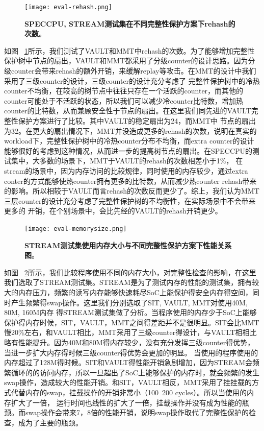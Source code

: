 \begin{figure}[!htp]
    \centering
    \texttt{[image: eval-rehash.png]}
    \caption{\textbf{SPECCPU, STREAM测试集在不同完整性保护方案下rehash的次数}。}
   \label{fig:eval-rehash}
\end{figure}
如图 ~\ref{fig:eval-rehash}所示，我们测试了VAULT和MMT中rehash的次数。为了能够增加完整性保护树中节点的扇出，VAULT和MMT都采用了分级counter的设计思路。因为分级counter会带来rehash的额外开销，来缓解replay等攻击。在MMT的设计中我们采用了三级counter的设计，三级counter的设计充分考虑了
完整性保护树中的冷热counter不均衡，在较高的树节点中往往只存在一个活跃的counter，而其他的counter可能处于不活跃的状态，所以我们可以减少冷counter比特数，增加热counter的比特数，从而兼顾安全性于节点的扇出。在这里我们同先进的VAULT完整性保护方案进行了比较。其中VAULT的稳定扇出为24，而MMT中
节点的扇出为32。在更大的扇出情况下，MMT并没造成更多的rehash的次数，说明在真实的workload下，完整性保护树中的冷热counter分布不均衡，而extra counter的设计能够很好的考虑到这种情况，从而进一步的提高树节点的扇出。在SPECCPU的测试集中，大多数的场景下，MMT于VAULT的rehash的次数相差小于1\%，
在stream的场景中，因为内存访问的比较规律，同时使用的内存较少，通过extra conter的方式能够使热counter拥有更多的比特数，从而减少热counter rehash带来的影响。所以相较于VAULT而言rehash的次数反而更少了。综上，我们认为MMT三层counter的设计充分考虑了完整性保护树的不均衡性，在实际场景中不会带来更多的
开销，在个别场景中，会比先经的VAULT的rehash开销更少。

\begin{figure}[!htp]
    \centering
    \texttt{[image: eval-memorysize.png]}
    \caption{\textbf{STREAM测试集使用内存大小与不同完整性保护方案下性能关系图}。}
   \label{fig:eval-memorysize}
\end{figure}
如图 ~\ref{fig:eval-memorysize}所示，我们比较程序使用不同的内存大小，对完整性检查的影响，在这里我们选取了STREAM测试集。STREAM是为了测试内存的性能的测试集，拥有较大的内存压力，频繁的读写内存能够快速耗尽SoC上能保护得安全内存得空间，同时产生频繁得swap操作。这里我们分别选取了SIT, VAULT, MMT对使用40M, 80M, 160M内存
得STREAM测试集做了分析。当程序使用的内存少于SoC上能够保护得内存时候，SIT，VAULT，MMT之间得差距并不是很明显。SIT会比MMT慢20\%左右，和VAULT相比，MMT采用了三级counter得设计，与VAULT相相比略有性能提升。因为40M和80M得内存较少，没有充分发挥三级counter得优势，当进一步扩大内存得时候三级counter得优势会更加的明显。
当使用的程序使用的内存超过了128M得时候。SIT和VAULT得性能开销急剧增加，因为STREAM会频繁循环的的访问内存，所以一旦超出了SoC上能够保护的内存时，就会频繁的发生swap操作，造成较大的性能开销。和SIT，VAULT相反，MMT采用了挂挂载的方式代替内存的swap，挂载操作的开销非常小（100~200 cycles）。所以当使用的内存扩大了一倍，
运行时间也线性的扩大了一倍，挂载操作并没有成为性能的瓶颈。而swap操作会带来7，8倍的性能开销，说明swap操作取代了完整性保护的检查，成为了主要的瓶颈。

